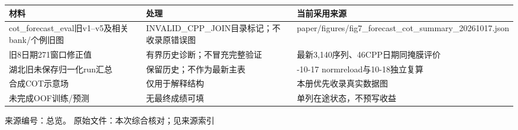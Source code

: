 \documentclass[UTF8,a4paper,landscape,10pt]{ctexart}
\begin{document}
\begin{center}\small
\begin{adjustbox}{max totalheight=0.58\textheight,max width=\linewidth}
\begin{minipage}{\linewidth}\begin{tabularx}{\linewidth}{>{\hsize=1.0000\hsize\raggedright\arraybackslash}X>{\hsize=1.0000\hsize\raggedright\arraybackslash}X>{\hsize=1.0000\hsize\raggedright\arraybackslash}X}\toprule
\textbf{材料} & \textbf{处理} & \textbf{当前采用来源} \\ \midrule
cot\_\allowbreak{}forecast\_\allowbreak{}eval旧v1–v5及相关bank/\allowbreak{}个例旧图 & INVALID\_\allowbreak{}CPP\_\allowbreak{}JOIN目录标记；不收录原错误图 & paper/\allowbreak{}figures/\allowbreak{}fig7\_\allowbreak{}forecast\_\allowbreak{}cot\_\allowbreak{}summary\_\allowbreak{}20261017.json \\
旧8日期271窗口修正值 & 有界历史诊断；不冒充完整验证 & 最新3,140序列、46CPP日期同掩膜评价 \\
湖北旧未保存归一化run汇总 & 保留历史；不作为最新主表 & 2026-10-17 normreload与10-18独立复算 \\
合成COT示意场 & 仅用于解释结构 & 本册优先收录真实数据图 \\
未完成OOF训练/\allowbreak{}预测 & 无最终成绩可填 & 单列在途状态，不预写收益 \\
\bottomrule\end{tabularx}\end{minipage}\end{adjustbox}\end{center}
\vfill{\scriptsize\color{muted} 来源编号：总览。 原始文件：本次综合核对；见来源索引}\par
\end{document}
